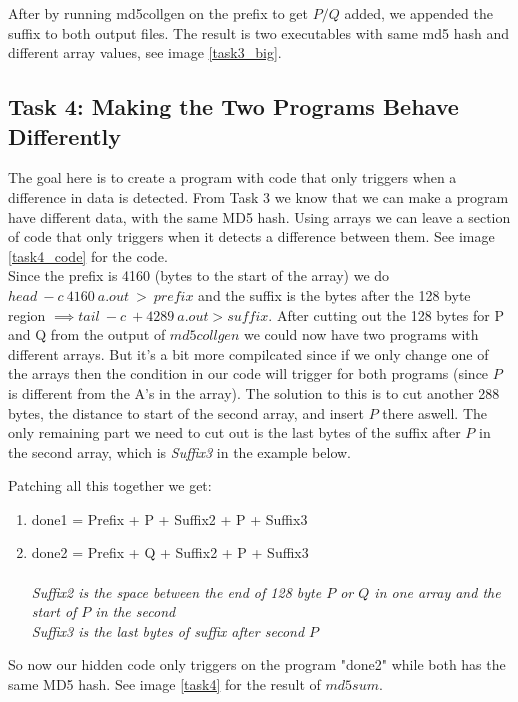 \documentclass[a4paper]{article}
\begin{document}
After by running md5collgen on the prefix to get $P/Q$ added, we appended the suffix to both output files. The result is two executables with same md5 hash and different array values, see image \ref{task3_big}.
\subsection{Task 4: Making the Two Programs Behave Differently}
The goal here is to create a program with code that only triggers when a difference in data is detected. From Task 3 we know that we can make a program have different data, with the same MD5 hash. Using arrays we can leave a section of code that only triggers when it detects a difference between them. See image \ref{task4_code} for the code.\\

Since the prefix is 4160 (bytes to the start of the array) we do $head\:-c\:4160\:a.out\:>\:prefix$ and the suffix is the bytes after the 128 byte region $\implies tail\:-c\:+4289\:a.out > suffix$.
After cutting out the 128 bytes for P and Q from the output of $md5collgen$ we could now have two programs with different arrays. But it's a bit more compilcated since if we only change one of the arrays then the condition in our code will trigger for both programs (since $P$ is different from the A's in the array). The solution to this is to cut another 288 bytes, the distance to start of the second array, and insert $P$ there aswell. 
The only remaining part we need to cut out is the last bytes of the suffix after $P$ in the second array, which is \textit{Suffix3} in the example below.

Patching all this together we get:
\begin{enumerate}
  \item done1 = Prefix + P + Suffix2 + P + Suffix3
  \item done2 = Prefix + Q + Suffix2 + P + Suffix3 \\ \\
  \textit{Suffix2 is the space between the end of 128 byte $P$ or $Q$ in one array and the start of $P$ in the second} \\
  \textit{Suffix3 is the last bytes of suffix after second $P$}
\end{enumerate}

So now our hidden code only triggers on the program "done2" while both has the same MD5 hash. See image \ref{task4} for the result of $md5sum$. \\
\end{document}
